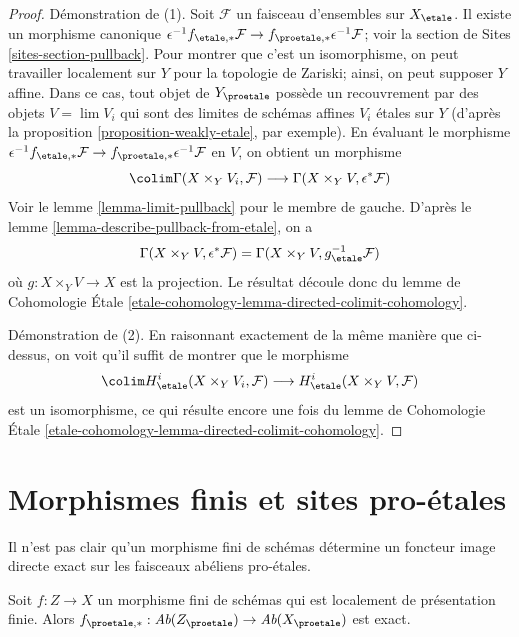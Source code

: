 \begin{proof}
Démonstration de (1). Soit $\mathcal{F}$ un faisceau d'ensembles sur $X_\etale$. Il existe
un morphisme canonique $\epsilon^{-1}f_{\etale, *}\mathcal{F} \to
f_{\proetale, *}\epsilon^{-1}\mathcal{F}$; voir la
section de Sites \ref{sites-section-pullback}.
Pour montrer que c'est un isomorphisme, on peut travailler localement sur $Y$ pour la topologie de Zariski; ainsi,
on peut supposer $Y$ affine. Dans ce cas,
tout objet de $Y_\proetale$ possède un recouvrement par des objets $V = \lim V_i$
qui sont des limites de schémas affines $V_i$ \'etales sur $Y$ (d'après la
proposition \ref{proposition-weakly-etale},
par exemple). En évaluant le morphisme
$\epsilon^{-1}f_{\etale, *}\mathcal{F} \to
f_{\proetale, *}\epsilon^{-1}\mathcal{F}$
en $V$, on obtient un morphisme
$$
\colim \Gamma(X \times_Y V_i, \mathcal{F})
\longrightarrow
\Gamma(X \times_Y V, \epsilon^*\mathcal{F})
$$
Voir le lemme \ref{lemma-limit-pullback} pour le membre de gauche.
D'après le lemme \ref{lemma-describe-pullback-from-etale}, on a
$$
\Gamma(X \times_Y V, \epsilon^*\mathcal{F}) =
\Gamma(X \times_Y V, g_\etale^{-1}\mathcal{F})
$$
où $g : X \times_Y V \to X$ est la projection. Le résultat découle donc du
lemme de Cohomologie \'Etale
\ref{etale-cohomology-lemma-directed-colimit-cohomology}.

\medskip\noindent
Démonstration de (2). En raisonnant exactement de la même manière que ci-dessus,
on voit qu'il suffit de montrer que le morphisme
$$
\colim H^i_\etale(X \times_Y V_i, \mathcal{F})
\longrightarrow
H^i_\etale(X \times_Y V, \mathcal{F})
$$
est un isomorphisme, ce qui résulte encore une fois du lemme de Cohomologie \'Etale
\ref{etale-cohomology-lemma-directed-colimit-cohomology}.
\end{proof}







\section{Morphismes finis et sites pro-\'etales}
\label{section-finite}

\noindent
Il n'est pas clair qu'un morphisme fini de schémas détermine
un foncteur image directe exact sur les faisceaux abéliens pro-\'etales.

\begin{lemma}
\label{lemma-finite}
Soit $f : Z \to X$ un morphisme fini de schémas qui est
localement de présentation finie. Alors
$f_{\proetale, *} : \textit{Ab}(Z_\proetale) \to \textit{Ab}(X_\proetale)$
est exact.
\end{lemma}


